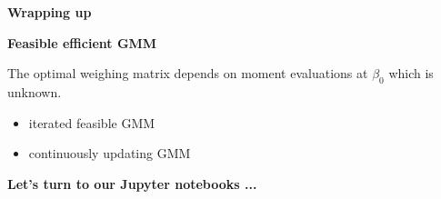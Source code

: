 \begin{frame}\begin{center}
		\LARGE\textbf{Wrapping up}
\end{center}\end{frame}
\begin{frame}\textbf{Feasible efficient GMM}\vspace{1cm}

The optimal weighing matrix depends on moment evaluations at $\beta_0$ which is unknown.\vspace{0.3cm}

\begin{itemize}\setlength\itemsep{1em}
\item iterated feasible GMM
\item continuously updating GMM
\end{itemize}
\end{frame}
\begin{frame}\textbf{Let's turn to our Jupyter notebooks ...}

\begin{figure}[htp]\centering
{}
\end{figure}


\end{frame}
